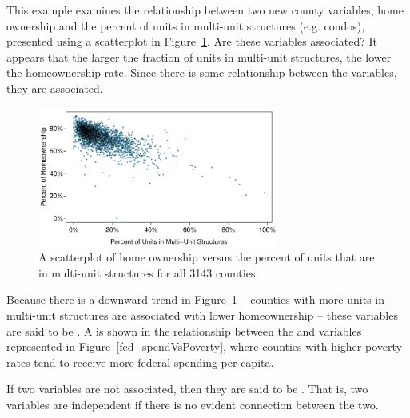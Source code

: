 \begin{example}{This example examines the relationship between two new county variables, home ownership and the percent of units in multi-unit structures (e.g. condos), presented using a scatterplot in Figure~\ref{multiunitsVsOwnership}. Are these variables associated?}
It appears that the larger the fraction of units in multi-unit structures, the lower the homeownership rate. Since there is some relationship between the variables, they are associated.
\end{example}
\begin{figure}
   \centering
   \includegraphics[width=0.7\textwidth]{01/figures/multiunitsVsOwnership/multiunitsVsOwnership}
   \caption{A scatterplot of home ownership versus the percent of units that are in multi-unit structures for all 3143 counties.}
   \label{multiunitsVsOwnership}
\end{figure}

Because there is a downward trend in Figure~\ref{multiunitsVsOwnership} -- counties with more units in multi-unit structures are associated with lower homeownership -- these variables are said to be . A  is shown in the relationship between the  and  variables represented in Figure~\ref{fed_spendVsPoverty}, where counties with higher poverty rates tend to receive more federal spending per capita.

If two variables are not associated, then they are said to be . That is, two variables are independent if there is no evident connection between the two.

